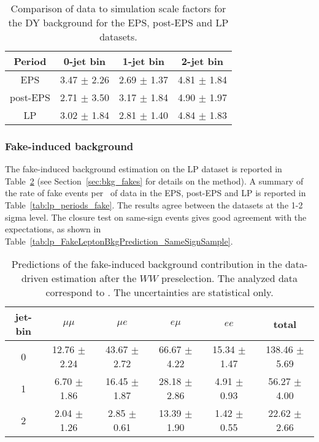\begin{table}[!htbp]
\begin{center}
\begin{tabular}{c c c c} 
\hline
Period & 0-jet bin & 1-jet bin & 2-jet bin \\ 
\hline
EPS      & 3.47 $\pm$ 2.26 & 2.69 $\pm$ 1.37 & 4.81 $\pm$ 1.84 \\
post-EPS & 2.71 $\pm$ 3.50 & 3.17 $\pm$ 1.84 & 4.90 $\pm$ 1.97 \\
LP       & 3.02 $\pm$ 1.84 & 2.81 $\pm$ 1.40 & 4.84 $\pm$ 1.83 \\
\hline
\end{tabular}
\caption{Comparison of data to simulation scale factors for the DY background for the EPS, post-EPS and LP datasets.}
\label{tab:lp_periods_dy}
\end{center}
\end{table}

\subsubsection{Fake-induced background}

The fake-induced background estimation on the LP dataset is reported in Table~\ref{tab:lp_fake_est} 
(see Section~\ref{sec:bkg_fakes} for details on the method).
A summary of the rate of fake events per \ifb~of data in the EPS, post-EPS and LP 
is reported in Table~\ref{tab:lp_periods_fake}.
The results agree between the datasets at the 1-2 sigma level.
The closure test on same-sign events gives good agreement with the expectations, 
as shown in Table~\ref{tab:lp_FakeLeptonBkgPrediction_SameSignSample}.

\begin{table}[!htbp]
\begin{center}
\begin{tabular}{c c c c c c} 
\hline
jet-bin &	 $\mu\mu$ &	 $\mu e$ &	 $e\mu$ &	 $ee$ &	 total \\ 
\hline
0 &	 12.76 $\pm$ 2.24 &	 43.67 $\pm$ 2.72 &	 66.67 $\pm$ 4.22 &	 15.34 $\pm$ 1.47 &	 138.46 $\pm$ 5.69 \\
1 &	 6.70 $\pm$ 1.86  &      16.45 $\pm$ 1.87 &      28.18 $\pm$ 2.86 &       4.91 $\pm$ 0.93 &       56.27 $\pm$ 4.00 \\
2 &	 2.04 $\pm$ 1.26  &       2.85 $\pm$ 0.61 &      13.39 $\pm$ 1.90 &       1.42 $\pm$ 0.55 &       22.62 $\pm$ 2.66 \\
\hline
\end{tabular}
\caption{Predictions of the fake-induced background contribution 
in the data-driven estimation after the $WW$ preselection. 
The analyzed data correspond to \lpintlumi.
The uncertainties are statistical only.}
\label{tab:lp_fake_est}
\end{center}
\end{table}

